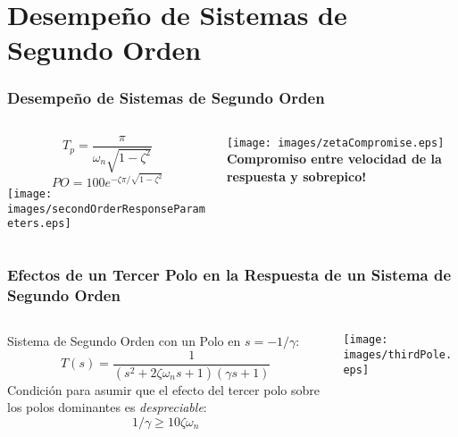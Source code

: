 \documentclass[aspectratio=169,handout]{beamer}
\theoremstyle{definition}
\theoremstyle{plain}
\theoremstyle{remark}
\begin{document}
\section{Desempeño de Sistemas de Segundo Orden}
\begin{frame}\frametitle{Desempeño de Sistemas de Segundo Orden}
\vspace*{3mm}
\begin{columns}
 \begin{column}{0.5\textwidth}
 \begin{equation*}
   T_p = \frac{\pi}{\omega_n \sqrt{1-\zeta^2}}
 \end{equation*}
 \begin{equation*}
   PO = 100 e^{-\zeta \pi/\sqrt{1-\zeta^2}}
 \end{equation*}
  \centering
  \texttt{[image: images/secondOrderResponseParameters.eps]}\\
 \end{column} 
 \pause
 \begin{column}{0.5\textwidth}
  \centering
  \texttt{[image: images/zetaCompromise.eps]}\\
  \textbf{Compromiso entre velocidad de la respuesta y sobrepico!}
 \end{column}
\end{columns} 
\end{frame}

\begin{frame}[<+->]\frametitle{Efectos de un Tercer Polo en la Respuesta de un Sistema de Segundo Orden}
\vspace*{5mm}
\begin{columns}
\begin{column}{0.5\textwidth}
Sistema de Segundo Orden con un Polo en $s=-1/\gamma$:
\begin{equation*}
	T(s) = \frac{1}{(s^2+2 \zeta \omega_n s + 1)(\gamma s + 1)}
\end{equation*}
Condición para asumir que el efecto del tercer polo sobre los polos dominantes es \textit{despreciable}:
\begin{equation*}
	1/\gamma \geq 10 \zeta \omega_n
\end{equation*}
\end{column}	
\begin{column}{0.5\textwidth}
\centering
\texttt{[image: images/thirdPole.eps]}
\end{column}	
\end{columns}
\end{frame}
\end{document}
